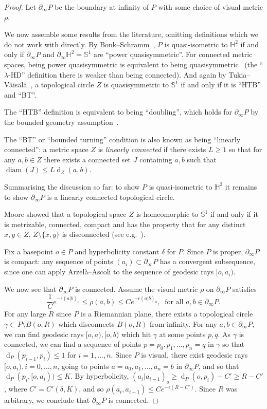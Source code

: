 \documentclass[11pt,a4paper]{amsart}
\DeclareMathOperator{\diam}{diam}
\DeclareMathOperator{\dist}{d}
\newcommand{\bdry}{\partial_\infty}
\newcommand{\bbH}{\mathbb{H}}
\theoremstyle{definition}
\begin{document}
\begin{proof}
	Let $\bdry P$ be the boundary at infinity of $P$ with some choice of visual metric $\rho$.
	
	We now assemble some results from the literature, omitting definitions which we do not work with directly.
	By Bonk--Schramm~\cite[Thms.~7.4,~8.2]{bonk2000embeddings}, $P$ is quasi-isometric to $\bbH^2$ if and only if $\bdry P$ and $\bdry \bbH^2 = \mathbb{S}^1$ are ``power quasisymmetric''.
	For connected metric spaces, being power quasisymmetric is equivalent to being quasisymmetric~\cite[Cor.~3.12]{TukiaVaisala-80-qs} (the ``$\lambda$-HD'' definition there is weaker than being connected).
	And again by Tukia--V\"ais\"al\"a~\cite[Thm.~4.9]{TukiaVaisala-80-qs}, a topological circle $Z$ is quasisymmetric to $\mathbb{S}^1$ if and only if it is ``HTB'' and ``BT''.  

	The ``HTB'' definition is equivalent to being ``doubling'', which holds for $\bdry P$ by the bounded geometry assumption~\cite[Thm. 9.2]{bonk2000embeddings}.

	The ``BT'' or ``bounded turning'' condition is also known as being ``linearly connected'': a metric space $Z$ is \emph{linearly connected} if there exists $L \geq 1$ so that for any $a,b \in Z$ there exists a connected set $J$ containing $a,b$ such that $\diam(J) \leq L \dist_Z(a,b)$.

	Summarising the discussion so far: to show $P$ is quasi-isometric to $\bbH^2$ it remains to show $\bdry P$ is a linearly connected topological circle.

	Moore showed that a topological space $Z$ is homeomorphic to $\mathbb{S}^1$ if and only if it is metrizable, connected, compact and has the property that for any distinct $x,y \in Z$, $Z \setminus \{x,y\}$ is disconnected (see e.g.~\cite[Thm.~2.28]{Hocking-Young-Topology}).

	Fix a basepoint $o\in P$ and hyperbolicity constant $\delta$ for $P$.
	Since $P$ is proper, $\bdry P$ is compact: any sequence of points $(a_i) \subset \bdry P$ has a convergent subsequence, since one can apply Arzel\`a--Ascoli to the sequence of geodesic rays $[o,a_i)$.

	We now see that $\bdry P$ is connected.  Assume the visual metric $\rho$ on $\bdry P$ satisfies 
	\[
		\frac{1}{C} e^{-\epsilon (a|b)_o} \leq \rho(a,b) \leq C e^{-\epsilon (a|b)_o}, \ \text{ for all } a,b \in \bdry P.
	\]
	For any large $R$ since $P$ is a Riemannian plane, there exists a topological circle $\gamma \subset P \setminus B(o,R)$ which disconnects $B(o,R)$ from infinity.
	For any $a,b \in \bdry P$, we can find geodesic rays $[o,a), [o,b)$ which hit $\gamma$ at some points $p,q$.  As $\gamma$ is connected, we can find a sequence of points $p=p_0, p_1,\ldots, p_n=q$ in $\gamma$ so that $\dist_P(p_{i-1},p_i) \leq 1$ for $i=1,\ldots,n$.  Since $P$ is visual, there exist geodesic rays $[o,a_i), i=0,\ldots,n$, going to points $a=a_0,a_1,\ldots,a_n=b$ in $\bdry P$, and so that $\dist_P(p_i,[o,a_i)) \leq K$.
	By hyperbolicity, $(a_i|a_{i+1})_o \geq \dist_P(o,p_i)-C' \geq R-C'$, where $C' = C'(\delta, K)$, and so $\rho(a_i,a_{i+1}) \leq C e^{-\epsilon (R-C')}$.
	Since $R$ was arbitrary, we conclude that $\bdry P$ is connected.


\end{proof}
\end{document}

